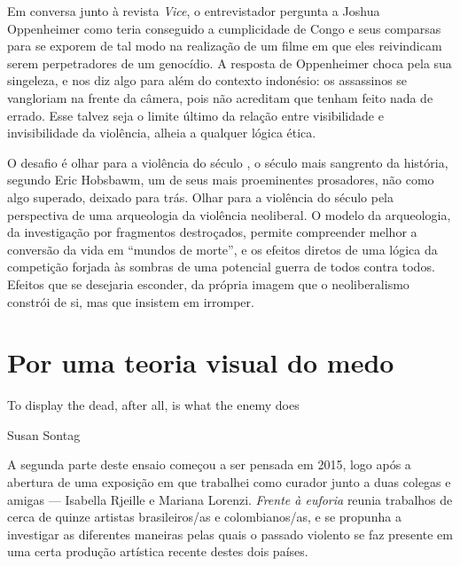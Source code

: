 \asterisc

Em conversa junto à revista \emph{Vice}, o entrevistador pergunta a Joshua
Oppenheimer como teria conseguido a cumplicidade de Congo e seus
comparsas para se exporem de tal modo na realização de um filme em que
eles reivindicam serem perpetradores de um genocídio. A resposta de
Oppenheimer choca pela sua singeleza, e nos diz algo para além do
contexto indonésio: os assassinos se vangloriam na frente da câmera,
pois não acreditam que tenham feito nada de errado. Esse talvez seja o
limite último da relação entre visibilidade e invisibilidade da
violência, alheia a qualquer lógica ética.

O desafio é olhar para a violência do século , o século mais sangrento
da história, segundo Eric Hobsbawm, um de seus mais proeminentes
prosadores, não como algo superado, deixado para trás. Olhar para a
violência do século  pela perspectiva de uma arqueologia da violência
neoliberal. O modelo da arqueologia, da investigação por fragmentos
destroçados, permite compreender melhor a conversão da vida em ``mundos
de morte'', e os efeitos diretos de uma lógica da competição forjada às
sombras de uma potencial guerra de todos contra todos. Efeitos que se
desejaria esconder, da própria imagem que o neoliberalismo constrói de
si, mas que insistem em irromper.


\section{Por uma teoria visual do medo}

\epigraph{To display the dead, after all, is what the enemy does}{Susan Sontag}

A segunda parte deste ensaio começou a ser pensada em 2015, logo após a
abertura de uma exposição em que trabalhei como curador junto a duas
colegas e amigas --- Isabella Rjeille e Mariana Lorenzi. \emph{Frente à
euforia} reunia trabalhos de cerca de quinze artistas brasileiros/as e
colombianos/as, e se propunha a investigar as diferentes maneiras pelas
quais o passado violento se faz presente em uma certa produção artística
recente destes dois países.

